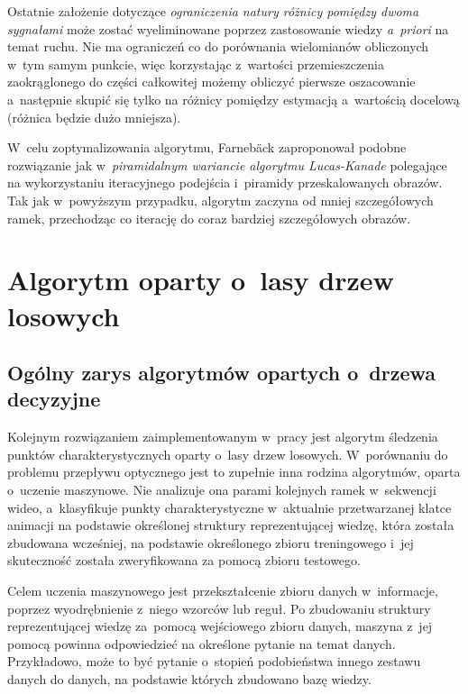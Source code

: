     Ostatnie założenie dotyczące \textit{ograniczenia natury różnicy pomiędzy dwoma sygnałami} może zostać wyeliminowane poprzez zastosowanie wiedzy \textit{a~priori} na temat ruchu. Nie ma ograniczeń co do porównania wielomianów obliczonych w~tym samym punkcie, więc korzystając z~wartości przemieszczenia zaokrąglonego do części całkowitej możemy obliczyć pierwsze oszacowanie a~następnie skupić się tylko na różnicy pomiędzy estymacją a~wartością docelową (różnica będzie dużo mniejsza).

    W~celu zoptymalizowania algorytmu, Farnebäck zaproponował podobne rozwiązanie jak w~\textit{piramidalnym wariancie algorytmu Lucas-Kanade} polegające na wykorzystaniu iteracyjnego podejścia i~piramidy przeskalowanych obrazów. Tak jak w~powyższym przypadku, algorytm zaczyna od mniej szczegółowych ramek, przechodząc co iterację do coraz bardziej szczegółowych obrazów.

  \section{Algorytm oparty o~lasy drzew losowych}\label{Subsection_RandomizedTrees}

    \subsection{Ogólny zarys algorytmów opartych o~drzewa decyzyjne}
    Kolejnym rozwiązaniem zaimplementowanym w~pracy jest algorytm śledzenia punktów charakterystycznych oparty o~lasy drzew losowych. W~porównaniu do problemu przepływu optycznego jest to zupełnie inna rodzina algorytmów, oparta o~uczenie maszynowe. Nie analizuje ona parami kolejnych ramek w~sekwencji wideo, a~klasyfikuje punkty charakterystyczne w~aktualnie przetwarzanej klatce animacji na podstawie określonej struktury reprezentującej wiedzę, która została zbudowana wcześniej, na podstawie określonego zbioru treningowego i~jej skuteczność została zweryfikowana za pomocą zbioru testowego.

    Celem uczenia maszynowego jest przekształcenie zbioru danych w~informacje, poprzez wyodrębnienie z~niego wzorców lub reguł. Po zbudowaniu struktury reprezentującej wiedzę za~pomocą wejściowego zbioru danych, maszyna z~jej pomocą powinna odpowiedzieć na określone pytanie na temat danych. Przykładowo, może to być pytanie o~stopień podobieństwa innego zestawu danych do danych, na podstawie których zbudowano bazę wiedzy.

